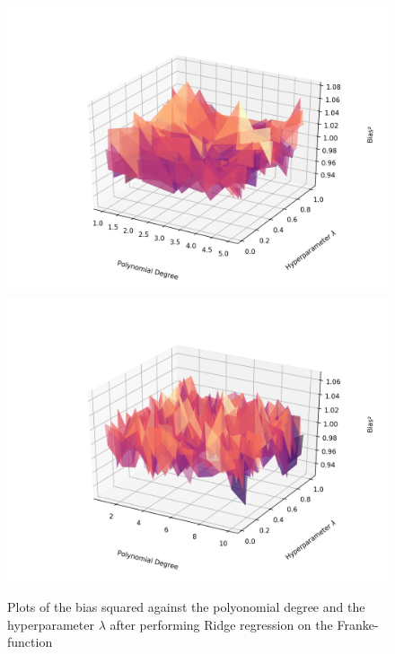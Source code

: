 \documentclass[a4paper,10pt,english]{article}
\begin{document}
\begin{figure}[H]
	\centering 
	\includegraphics[scale=0.47]{../franke_output/part_D_4.png}
	\includegraphics[scale=0.47]{../franke_output/part_D_4_highdeg.png}
	\caption{
		Plots of the bias squared against the polyonomial degree and the hyperparameter $\lambda$ after performing Ridge regression on the Franke-function 
	}
	\label{part_d4}
\end{figure}
\end{document}
